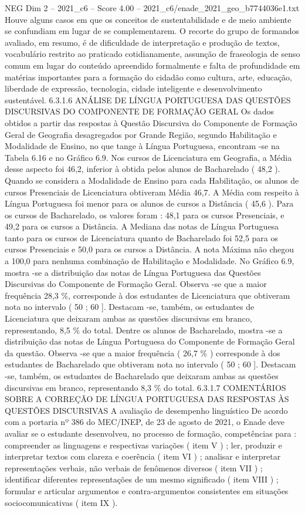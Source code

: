 \begin{textsample}{NEG Dim 2 – 2021\_c6 – Score 4.00 – 2021\_c6/enade\_2021\_geo\_b7744036e1.txt}
Houve alguns casos em que os conceitos de sustentabilidade e de meio ambiente se confundiam em lugar de se complementarem.
O recorte do grupo de formandos avaliado, em resumo, é de dificuldade de interpretação e produção de textos, vocabulário restrito ao praticado cotidianamente, assunção de fraseologia de senso comum em lugar do conteúdo apreendido formalmente e falta de profundidade em matérias importantes para a formação do cidadão como cultura, arte, educação, liberdade de expressão, tecnologia, cidade inteligente e desenvolvimento sustentável. 6.3.1.6 ANÁLISE DE LÍNGUA PORTUGUESA DAS QUESTÕES DISCURSIVAS DO COMPONENTE DE FORMAÇÃO GERAL Os dados obtidos a partir das respostas à Questão Discursiva do Componente de Formação Geral de Geografia desagregados por Grande Região, segundo Habilitação e Modalidade de Ensino, no que tange à Língua Portuguesa, encontram -se na Tabela 6.16 e no Gráfico 6.9.
Nos cursos de Licenciatura em Geografia, a Média desse aspecto foi 46,2, inferior à obtida pelos alunos de Bacharelado ( 48,2 ).
Quando se considera a Modalidade de Ensino para cada Habilitação, os alunos de cursos Presenciais de Licenciatura obtiveram Média 46,7.
A Média com respeito à Língua Portuguesa foi menor para os alunos de cursos a Distância ( 45,6 ).
Para os cursos de Bacharelado, os valores foram : 48,1 para os cursos Presenciais, e 49,2 para os cursos a Distância.
A Mediana das notas de Língua Portuguesa tanto para os cursos de Licenciatura quanto de Bacharelado foi 52,5 para os cursos Presenciais e 50,0 para os cursos a Distância.
A nota Máxima não chegou a 100,0 para nenhuma combinação de Habilitação e Modalidade.
No Gráfico 6.9, mostra -se a distribuição das notas de Língua Portuguesa das Questões Discursivas do Componente de Formação Geral.
Observa -se que a maior frequência 28,3 \%, corresponde à dos estudantes de Licenciatura que obtiveram nota no intervalo ( 50 ; 60 ].
Destacam -se, também, os estudantes de Licenciatura que deixaram ambas as questões discursivas em branco, representando, 8,5 \% do total.
Dentre os alunos de Bacharelado, mostra -se a distribuição das notas de Língua Portuguesa do Componente de Formação Geral da questão.
Observa -se que a maior frequência ( 26,7 \% ) corresponde à dos estudantes de Bacharelado que obtiveram nota no intervalo ( 50 ; 60 ].
Destacam -se, também, os estudantes de Bacharelado que deixaram ambas as questões discursivas em branco, representando 8,3 \% do total. 6.3.1.7 COMENTÁRIOS SOBRE A CORREÇÃO DE LÍNGUA PORTUGUESA DAS RESPOSTAS ÀS QUESTÕES DISCURSIVAS A avaliação de desempenho linguístico De acordo com a portaria nº 386 do MEC/INEP, de 23 de agosto de 2021, o Enade deve avaliar se o estudante desenvolveu, no processo de formação, competências para : compreender as linguagens e respectivas variações ( item V ) ; ler, produzir e interpretar textos com clareza e coerência ( item VI ) ; analisar e interpretar representações verbais, não verbais de fenômenos diversos ( item VII ) ; identificar diferentes representações de um mesmo significado ( item VIII ) ; formular e articular argumentos e contra-argumentos consistentes em situações sociocomunicativas ( item IX ).

\end{textsample}
